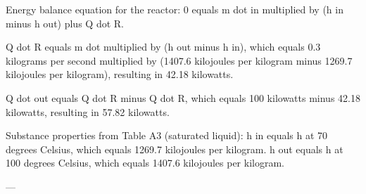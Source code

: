 Energy balance equation for the reactor:  
0 equals m dot in multiplied by (h in minus h out) plus Q dot R.  

Q dot R equals m dot multiplied by (h out minus h in), which equals 0.3 kilograms per second multiplied by (1407.6 kilojoules per kilogram minus 1269.7 kilojoules per kilogram), resulting in 42.18 kilowatts.  

Q dot out equals Q dot R minus Q dot R, which equals 100 kilowatts minus 42.18 kilowatts, resulting in 57.82 kilowatts.  

Substance properties from Table A3 (saturated liquid):  
h in equals h at 70 degrees Celsius, which equals 1269.7 kilojoules per kilogram.  
h out equals h at 100 degrees Celsius, which equals 1407.6 kilojoules per kilogram.  

---